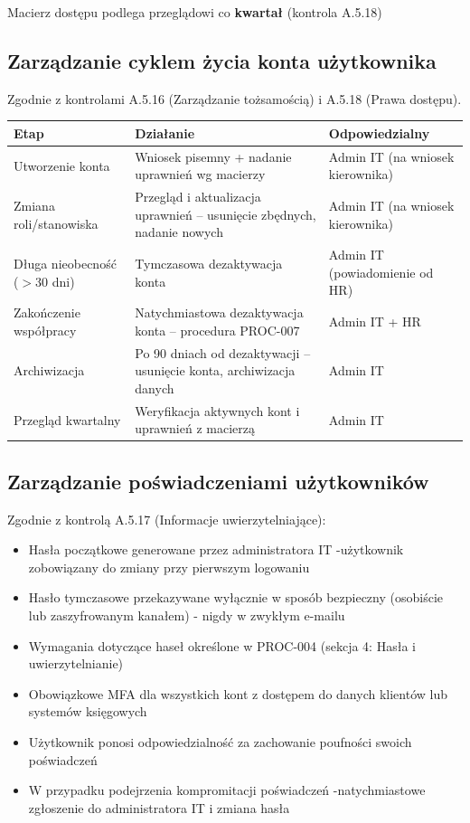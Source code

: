 \documentclass[12pt,a4paper]{article}
\providecommand{\tightlist}{\setlength{\itemsep}{0pt}\setlength{\parskip}{0pt}}
\begin{document}
Macierz dostępu podlega przeglądowi co \textbf{kwartał} (kontrola A.5.18)

\subsection{Zarządzanie cyklem życia konta użytkownika}\label{cykl-zycia-konta}

Zgodnie z kontrolami A.5.16 (Zarządzanie tożsamością) i A.5.18 (Prawa dostępu).

\begin{longtable}[]{@{}>{\raggedright\arraybackslash}p{}>{\raggedright\arraybackslash}p{}>{\raggedright\arraybackslash}p{}@{}}
\toprule\noalign{}
Etap & Działanie & Odpowiedzialny \\
\midrule\noalign{}
\endhead
\bottomrule\noalign{}
\endlastfoot
Utworzenie konta & Wniosek pisemny + nadanie uprawnień wg macierzy & Admin IT (na wniosek kierownika) \\
Zmiana roli/stanowiska & Przegląd i aktualizacja uprawnień -- usunięcie zbędnych, nadanie nowych & Admin IT (na wniosek kierownika) \\
Długa nieobecność ($>$30 dni) & Tymczasowa dezaktywacja konta & Admin IT (powiadomienie od HR) \\
Zakończenie współpracy & Natychmiastowa dezaktywacja konta -- procedura PROC-007 & Admin IT + HR \\
Archiwizacja & Po 90 dniach od dezaktywacji -- usunięcie konta, archiwizacja danych & Admin IT \\
Przegląd kwartalny & Weryfikacja aktywnych kont i uprawnień z macierzą & Admin IT \\
\end{longtable}

\subsection{Zarządzanie poświadczeniami użytkowników}\label{zarzadzanie-poswiadczeniami}

Zgodnie z kontrolą A.5.17 (Informacje uwierzytelniające):

\begin{itemize}
\tightlist
\item
  Hasła początkowe generowane przez administratora IT -użytkownik zobowiązany do zmiany przy pierwszym logowaniu
\item
  Hasło tymczasowe przekazywane wyłącznie w sposób bezpieczny (osobiście lub zaszyfrowanym kanałem) - nigdy w zwykłym e-mailu
\item
  Wymagania dotyczące haseł określone w PROC-004 (sekcja 4: Hasła i uwierzytelnianie)
\item
  Obowiązkowe MFA dla wszystkich kont z dostępem do danych klientów lub systemów księgowych
\item
  Użytkownik ponosi odpowiedzialność za zachowanie poufności swoich poświadczeń
\item
  W przypadku podejrzenia kompromitacji poświadczeń -natychmiastowe zgłoszenie do administratora IT i zmiana hasła
\end{itemize}
\end{document}
